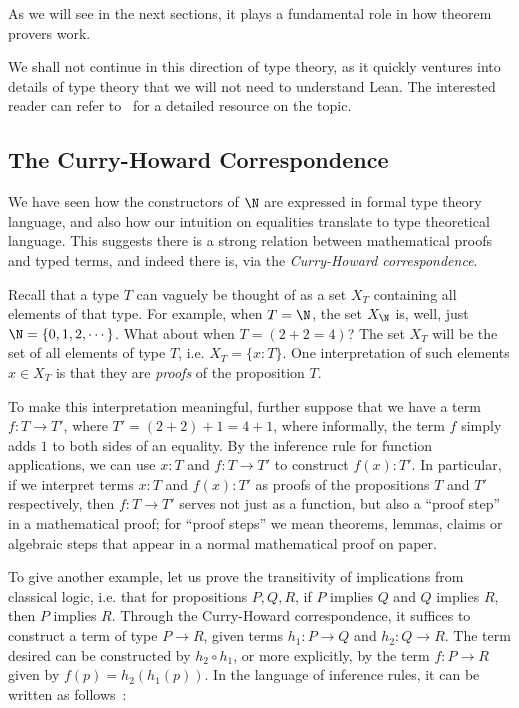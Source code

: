 As we will see in the next sections, it plays a fundamental role in how theorem provers work.

We shall not continue in this direction of type theory, as it quickly ventures into details of type theory that we will not need to understand Lean. The interested reader can refer to~\cite{Rijke2022} for a detailed resource on the topic.

\subsection{The Curry-Howard Correspondence} \label{sec:ch-correspondence}

We have seen how the constructors of \(\N\) are expressed in formal type theory language, and also how our intuition on equalities translate to type theoretical language. This suggests there is a strong relation between mathematical proofs and typed terms, and indeed there is, via the \textit{Curry-Howard correspondence}.

Recall that a type \(T\) can vaguely be thought of as a set \(X_T\) containing all elements of that type. For example, when \(T = \N\), the set \(X_{\N}\) is, well, just \(\N = \{0, 1, 2, \cdots\}\). What about when \(T = (2 + 2 = 4)\)? The set \(X_T\) will be the set of all elements of type \(T\), i.e. \(X_T = \{x : T\}\). One interpretation of such elements \(x \in X_T\) is that they are \textit{proofs} of the proposition \(T\).

To make this interpretation meaningful, further suppose that we have a term \(f : T \to T'\), where \(T' = (2 + 2) + 1 = 4 + 1\), where informally, the term \(f\) simply adds \(1\) to both sides of an equality. By the inference rule for function applications, we can use \(x : T\) and \(f : T \to T'\) to construct \(f(x) : T'\). In particular, if we interpret terms \(x : T\) and \(f(x) : T'\) as proofs of the propositions \(T\) and \(T'\) respectively, then \(f : T \to T'\) serves not just as a function, but also a ``proof step'' in a mathematical proof; for ``proof steps'' we mean theorems, lemmas, claims or algebraic steps that appear in a normal mathematical proof on paper.

To give another example, let us prove the transitivity of implications from classical logic, i.e. that for propositions \(P, Q, R\), if \(P\) implies \(Q\) and \(Q\) implies \(R\), then \(P\) implies \(R\). Through the Curry-Howard correspondence, it suffices to construct a term of type \(P \to R\), given terms \(h_1 : P \to Q\) and \(h_2 : Q \to R\). The term desired can be constructed by \(h_2 \circ h_1\), or more explicitly, by the term \(f : P \to R\) given by \(f(p) = h_2(h_1(p))\). In the language of inference rules, it can be written as follows~\label{ch-tree}:

